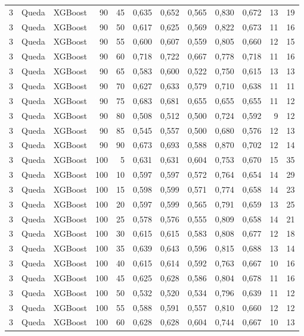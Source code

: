 \begin{longtable}{@{}rllrrrrrrrrr@{}}
3 & Queda & XGBoost & 90 & 45 & 0,635 & 0,652 & 0,565 & 0,830 & 0,672 & 13 & 19 \\
3 & Queda & XGBoost & 90 & 50 & 0,617 & 0,625 & 0,569 & 0,822 & 0,673 & 11 & 16 \\
3 & Queda & XGBoost & 90 & 55 & 0,600 & 0,607 & 0,559 & 0,805 & 0,660 & 12 & 15 \\
3 & Queda & XGBoost & 90 & 60 & 0,718 & 0,722 & 0,667 & 0,778 & 0,718 & 11 & 16 \\
3 & Queda & XGBoost & 90 & 65 & 0,583 & 0,600 & 0,522 & 0,750 & 0,615 & 13 & 13 \\
3 & Queda & XGBoost & 90 & 70 & 0,627 & 0,633 & 0,579 & 0,710 & 0,638 & 11 & 11 \\
3 & Queda & XGBoost & 90 & 75 & 0,683 & 0,681 & 0,655 & 0,655 & 0,655 & 11 & 12 \\
3 & Queda & XGBoost & 90 & 80 & 0,508 & 0,512 & 0,500 & 0,724 & 0,592 & 9 & 12 \\
3 & Queda & XGBoost & 90 & 85 & 0,545 & 0,557 & 0,500 & 0,680 & 0,576 & 12 & 13 \\
3 & Queda & XGBoost & 90 & 90 & 0,673 & 0,693 & 0,588 & 0,870 & 0,702 & 12 & 14 \\
3 & Queda & XGBoost & 100 & 5 & 0,631 & 0,631 & 0,604 & 0,753 & 0,670 & 15 & 35 \\
3 & Queda & XGBoost & 100 & 10 & 0,597 & 0,597 & 0,572 & 0,764 & 0,654 & 14 & 29 \\
3 & Queda & XGBoost & 100 & 15 & 0,598 & 0,599 & 0,571 & 0,774 & 0,658 & 14 & 23 \\
3 & Queda & XGBoost & 100 & 20 & 0,597 & 0,599 & 0,565 & 0,791 & 0,659 & 13 & 25 \\
3 & Queda & XGBoost & 100 & 25 & 0,578 & 0,576 & 0,555 & 0,809 & 0,658 & 14 & 21 \\
3 & Queda & XGBoost & 100 & 30 & 0,615 & 0,615 & 0,583 & 0,808 & 0,677 & 12 & 18 \\
3 & Queda & XGBoost & 100 & 35 & 0,639 & 0,643 & 0,596 & 0,815 & 0,688 & 13 & 14 \\
3 & Queda & XGBoost & 100 & 40 & 0,615 & 0,614 & 0,592 & 0,763 & 0,667 & 10 & 16 \\
3 & Queda & XGBoost & 100 & 45 & 0,625 & 0,628 & 0,586 & 0,804 & 0,678 & 11 & 16 \\
3 & Queda & XGBoost & 100 & 50 & 0,532 & 0,520 & 0,534 & 0,796 & 0,639 & 11 & 12 \\
3 & Queda & XGBoost & 100 & 55 & 0,588 & 0,591 & 0,557 & 0,810 & 0,660 & 12 & 12 \\
3 & Queda & XGBoost & 100 & 60 & 0,628 & 0,628 & 0,604 & 0,744 & 0,667 & 10 & 13 \\

\end{longtable}
